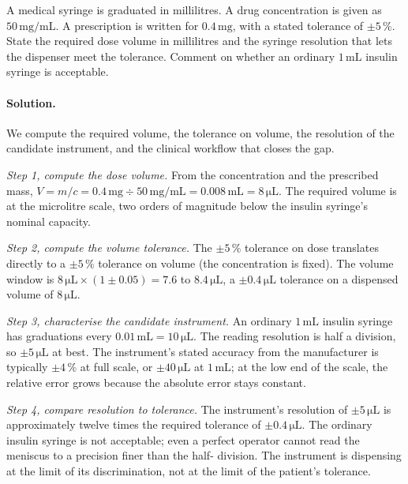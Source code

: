 \begin{exercise}
A medical syringe is graduated in millilitres. A drug concentration
is given as $50 \,\si{\milli\gram\per\milli\liter}$. A prescription is
written for $0.4 \,\si{\milli\gram}$, with a stated tolerance of
$\pm 5\,\%$. State the required dose volume in millilitres and the
syringe resolution that lets the dispenser meet the tolerance.
Comment on whether an ordinary $1 \,\si{\milli\liter}$ insulin
syringe is acceptable.

\paragraph{Solution.}
We compute the required volume, the tolerance on volume, the
resolution of the candidate instrument, and the clinical workflow
that closes the gap.

\textit{Step 1, compute the dose volume.} From the concentration and
the prescribed mass,
$V = m/c = 0.4 \,\si{\milli\gram} \div 50 \,\si{\milli\gram\per\milli
\liter} = 0.008 \,\si{\milli\liter} = 8 \,\si{\micro\liter}$. The
required volume is at the microlitre scale, two orders of magnitude
below the insulin syringe's nominal capacity.

\textit{Step 2, compute the volume tolerance.} The $\pm 5\,\%$
tolerance on dose translates directly to a $\pm 5\,\%$ tolerance on
volume (the concentration is fixed). The volume window is
$8 \,\si{\micro\liter} \times (1 \pm 0.05) = 7.6$ to $8.4 \,\si{
\micro\liter}$, a $\pm 0.4 \,\si{\micro\liter}$ tolerance on a
dispensed volume of $8 \,\si{\micro\liter}$.

\textit{Step 3, characterise the candidate instrument.} An ordinary
$1 \,\si{\milli\liter}$ insulin syringe has graduations every
$0.01 \,\si{\milli\liter} = 10 \,\si{\micro\liter}$. The reading
resolution is half a division, so $\pm 5 \,\si{\micro\liter}$ at
best. The instrument's stated accuracy from the manufacturer is
typically $\pm 4\,\%$ at full scale, or $\pm 40 \,\si{\micro\liter}$
at $1 \,\si{\milli\liter}$; at the low end of the scale, the relative
error grows because the absolute error stays constant.

\textit{Step 4, compare resolution to tolerance.} The instrument's
resolution of $\pm 5 \,\si{\micro\liter}$ is approximately twelve
times the required tolerance of $\pm 0.4 \,\si{\micro\liter}$. The
ordinary insulin syringe is not acceptable; even a perfect operator
cannot read the meniscus to a precision finer than the half-
division. The instrument is dispensing at the limit of its
discrimination, not at the limit of the patient's tolerance.


\end{exercise}
